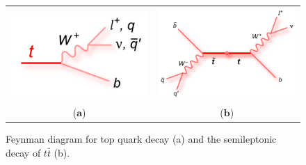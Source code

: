 \begin{figure}[htp]
\centering
\begin{tabular}{cc}
\hspace{-0.3cm}
\includegraphics[scale=0.19]{fig/sm_beyond/single_top_decay.png}
& \hspace{-0.5cm} \includegraphics[scale=0.19]{fig/sm_beyond/ttbar_decay.png}\\
   ($\mathbf{a}$)\qquad\qquad\qquad&($\mathbf{b}$)\qquad\\
\end{tabular}
\caption{Feynman diagram for top quark decay (a) and the semileptonic decay of $t\bar{t} $ (b).}\label{fig:top_decay}
\end{figure}
